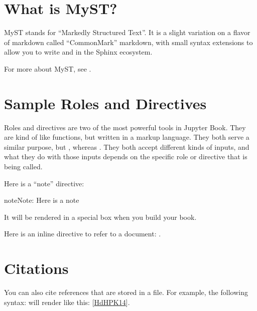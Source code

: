 \documentclass[letterpaper,10pt,english]{jupyterBook}
\begin{document}
\section{What is MyST?}
\label{\detokenize{markdown:what-is-myst}}
\sphinxAtStartPar
MyST stands for “Markedly Structured Text”. It
is a slight variation on a flavor of markdown called “CommonMark” markdown,
with small syntax extensions to allow you to write  and 
in the Sphinx ecosystem.

\sphinxAtStartPar
For more about MyST, see .


\section{Sample Roles and Directives}
\label{\detokenize{markdown:sample-roles-and-directives}}
\sphinxAtStartPar
Roles and directives are two of the most powerful tools in Jupyter Book. They
are kind of like functions, but written in a markup language. They both
serve a similar purpose, but , whereas
. They both accept different kinds of inputs,
and what they do with those inputs depends on the specific role or directive
that is being called.

\sphinxAtStartPar
Here is a “note” directive:

\begin{sphinxadmonition}{note}{Note:}
\sphinxAtStartPar
Here is a note
\end{sphinxadmonition}

\sphinxAtStartPar
It will be rendered in a special box when you build your book.

\sphinxAtStartPar
Here is an inline directive to refer to a document: {\hyperref[\detokenize{markdown-notebooks::doc}]{}}.


\section{Citations}
\label{\detokenize{markdown:citations}}
\sphinxAtStartPar
You can also cite references that are stored in a  file. For example,
the following syntax:  will render like
this: {[}\hyperlink{cite.markdown:id3}{HdHPK14}{]}.
\end{document}
